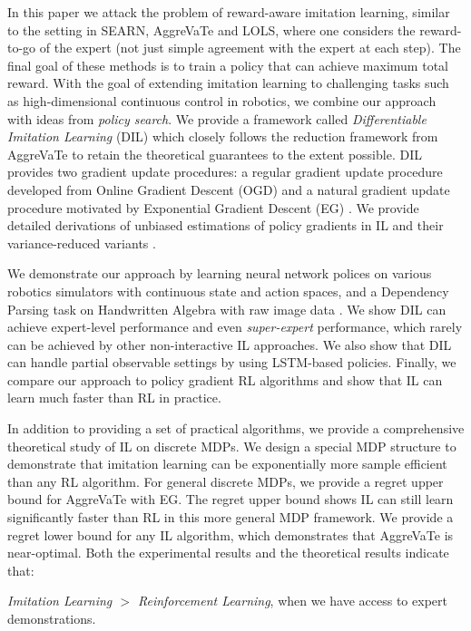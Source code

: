 \documentclass{article}
\begin{document}
In this paper we attack the problem of reward-aware imitation learning, similar to the setting in SEARN, AggreVaTe and LOLS, where one considers the reward-to-go of the expert (not just  simple agreement with the expert at each step). The final goal of these methods is to train a policy that can achieve maximum total reward. 
With the goal of extending imitation learning to challenging tasks such as high-dimensional continuous control in robotics, we combine our approach with ideas from \emph{policy search}. We provide a framework called \emph{Differentiable  Imitation Learning} (DIL) which closely follows the reduction framework from AggreVaTe \cite{ross2014reinforcement} to retain the theoretical guarantees to the extent possible. DIL provides two gradient update procedures: a regular gradient update procedure developed from Online Gradient Descent (OGD) \cite{Zinkevich2003_ICML} and a natural gradient update procedure motivated by Exponential Gradient Descent (EG) \cite{shalev2012online}. We provide detailed derivations of unbiased estimations of policy gradients in IL and their variance-reduced variants \cite{greensmith2004variance}. 

We demonstrate our approach by learning neural network polices on various robotics simulators with continuous state and action spaces, and a Dependency Parsing task on Handwritten Algebra with raw image data \cite{duyckpredicting}. We show DIL can achieve expert-level performance and even \emph{super-expert} performance, which rarely can be achieved by other non-interactive IL approaches. We also show that DIL can handle partial observable settings by using LSTM-based policies. Finally, we compare our approach to policy gradient RL algorithms and show that IL can learn much faster than RL in practice. 

In addition to providing a set of practical algorithms, we provide a comprehensive  theoretical study of IL on discrete MDPs. We design a special MDP structure to demonstrate that imitation learning can be exponentially more sample efficient than any RL algorithm. For general discrete MDPs, we provide a regret upper bound for AggreVaTe with EG. The regret upper bound shows IL can still learn significantly faster than RL in this more general MDP framework. We provide a regret lower bound for any IL algorithm, which demonstrates that AggreVaTe is near-optimal. Both the experimental results and the theoretical results indicate that: 
\begin{displayquote}
\emph{Imitation Learning $>$ Reinforcement Learning}, when we have access to expert demonstrations.
\end{displayquote}
\end{document}
